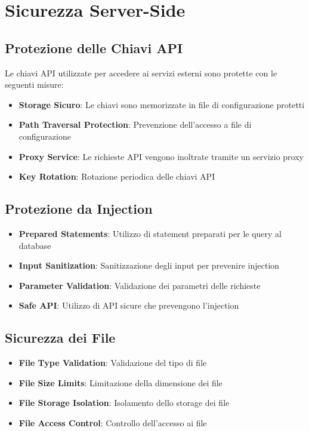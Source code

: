 \section{Sicurezza Server-Side}

\subsection{Protezione delle Chiavi API}
Le chiavi API utilizzate per accedere ai servizi esterni sono protette con le seguenti misure:

\begin{itemize}
    \item \textbf{Storage Sicuro}: Le chiavi sono memorizzate in file di configurazione protetti
    \item \textbf{Path Traversal Protection}: Prevenzione dell'accesso a file di configurazione
    \item \textbf{Proxy Service}: Le richieste API vengono inoltrate tramite un servizio proxy
    \item \textbf{Key Rotation}: Rotazione periodica delle chiavi API
\end{itemize}

\subsection{Protezione da Injection}
\begin{itemize}
    \item \textbf{Prepared Statements}: Utilizzo di statement preparati per le query al database
    \item \textbf{Input Sanitization}: Sanitizzazione degli input per prevenire injection
    \item \textbf{Parameter Validation}: Validazione dei parametri delle richieste
    \item \textbf{Safe API}: Utilizzo di API sicure che prevengono l'injection
\end{itemize}

\subsection{Sicurezza dei File}
\begin{itemize}
    \item \textbf{File Type Validation}: Validazione del tipo di file
    \item \textbf{File Size Limits}: Limitazione della dimensione dei file
    \item \textbf{File Storage Isolation}: Isolamento dello storage dei file
    \item \textbf{File Access Control}: Controllo dell'accesso ai file
\end{itemize}

